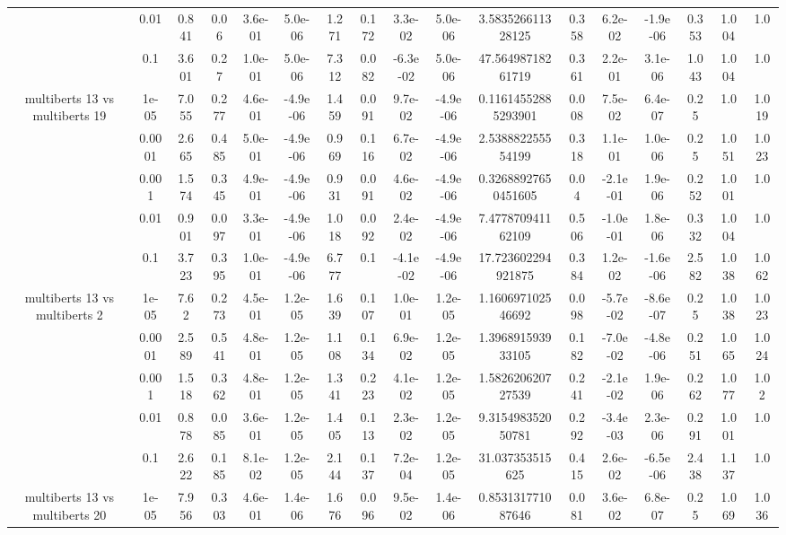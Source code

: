 \begin{tabular}{|c|c|c|c|c|c|c|c|c|c|c|c|c|c|c|c|c|}
 & 0.01 & 0.841 & 0.06 & 3.6e-01 & 5.0e-06 & 1.271 & 0.172 & 3.3e-02 & 5.0e-06 & 3.583526611328125 & 0.358 & 6.2e-02 & -1.9e-06 & 0.353 & 1.004 & 1.0 \\
 & 0.1 & 3.601 & 0.27 & 1.0e-01 & 5.0e-06 & 7.312 & 0.082 & -6.3e-02 & 5.0e-06 & 47.56498718261719 & 0.361 & 2.2e-01 & 3.1e-06 & 1.043 & 1.004 & 1.0 \\
\hline
\multirow{5}{*}{multiberts 13 vs multiberts 19} & 1e-05 & 7.055 & 0.277 & 4.6e-01 & -4.9e-06 & 1.459 & 0.091 & 9.7e-02 & -4.9e-06 & 0.11614552885293901 & 0.008 & 7.5e-02 & 6.4e-07 & 0.25 & 1.0 & 1.019 \\
 & 0.0001 & 2.665 & 0.485 & 5.0e-01 & -4.9e-06 & 0.969 & 0.116 & 6.7e-02 & -4.9e-06 & 2.538882255554199 & 0.318 & 1.1e-01 & 1.0e-06 & 0.25 & 1.051 & 1.023 \\
 & 0.001 & 1.574 & 0.345 & 4.9e-01 & -4.9e-06 & 0.931 & 0.091 & 4.6e-02 & -4.9e-06 & 0.32688927650451605 & 0.04 & -2.1e-01 & 1.9e-06 & 0.252 & 1.001 & 1.0 \\
 & 0.01 & 0.901 & 0.097 & 3.3e-01 & -4.9e-06 & 1.018 & 0.092 & 2.4e-02 & -4.9e-06 & 7.477870941162109 & 0.506 & -1.0e-01 & 1.8e-06 & 0.332 & 1.004 & 1.0 \\
 & 0.1 & 3.723 & 0.395 & 1.0e-01 & -4.9e-06 & 6.777 & 0.1 & -4.1e-02 & -4.9e-06 & 17.723602294921875 & 0.384 & 1.2e-02 & -1.6e-06 & 2.582 & 1.038 & 1.062 \\
\hline
\multirow{5}{*}{multiberts 13 vs multiberts 2} & 1e-05 & 7.62 & 0.273 & 4.5e-01 & 1.2e-05 & 1.639 & 0.107 & 1.0e-01 & 1.2e-05 & 1.160697102546692 & 0.098 & -5.7e-02 & -8.6e-07 & 0.25 & 1.038 & 1.023 \\
 & 0.0001 & 2.589 & 0.541 & 4.8e-01 & 1.2e-05 & 1.108 & 0.134 & 6.9e-02 & 1.2e-05 & 1.396891593933105 & 0.182 & -7.0e-02 & -4.8e-06 & 0.251 & 1.065 & 1.024 \\
 & 0.001 & 1.518 & 0.362 & 4.8e-01 & 1.2e-05 & 1.341 & 0.223 & 4.1e-02 & 1.2e-05 & 1.582620620727539 & 0.241 & -2.1e-02 & 1.9e-06 & 0.262 & 1.077 & 1.02 \\
 & 0.01 & 0.878 & 0.085 & 3.6e-01 & 1.2e-05 & 1.405 & 0.113 & 2.3e-02 & 1.2e-05 & 9.315498352050781 & 0.292 & -3.4e-03 & 2.3e-06 & 0.291 & 1.001 & 1.0 \\
 & 0.1 & 2.622 & 0.185 & 8.1e-02 & 1.2e-05 & 2.144 & 0.137 & 7.2e-04 & 1.2e-05 & 31.037353515625 & 0.415 & 2.6e-02 & -6.5e-06 & 2.438 & 1.137 & 1.0 \\
\hline
\multirow{5}{*}{multiberts 13 vs multiberts 20} & 1e-05 & 7.956 & 0.303 & 4.6e-01 & 1.4e-06 & 1.676 & 0.096 & 9.5e-02 & 1.4e-06 & 0.853131771087646 & 0.081 & 3.6e-02 & 6.8e-07 & 0.25 & 1.069 & 1.036 \\

\end{tabular}
